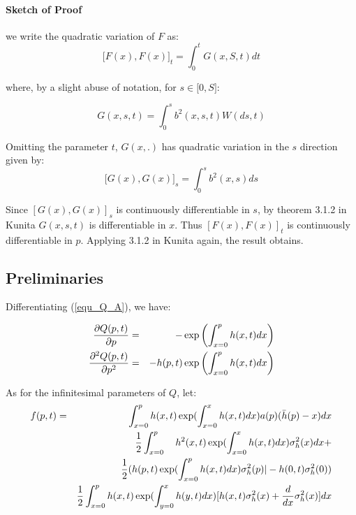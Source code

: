 \documentclass{article}
\begin{document}
\paragraph{Sketch of Proof}

we write the quadratic variation of $F$ as:%
\begin{equation*}
\lbrack F(x),F(x)]_{t}=\int_{0}^{t}G(x,S,t)dt
\end{equation*}

where, by a slight abuse of notation, for $s\in \lbrack 0,S]$:

\begin{equation*}
G(x,s,t)=\int_{0}^{s}b^{2}(x,s,t)W(ds,t)
\end{equation*}

Omitting the parameter $t$, $G(x,.)$ has quadratic variation in the $s$
direction given by:%
\begin{equation*}
\lbrack G(x),G(x)]_{s}=\int_{0}^{s}b^{2}(x,s)ds
\end{equation*}

Since $[G(x),G(x)]_{s}$ is continuously differentiable in $s$, by theorem
3.1.2 in Kunita $G(x,s,t)$ is differentiable in $x$. Thus $[F(x),F(x)]_{t}$
is continuously differentiable in $p$. Applying 3.1.2 in Kunita again, the
result obtains.

\subsection{Preliminaries}

Differentiating (\ref{equ_Q_A}), we have:

\begin{eqnarray}
\frac{\partial Q(p,t)}{\partial p} &=&-\exp \left( {\int_{x=0}^{p}h(x,t)dx}%
\right)   \label{dQdp_3} \\
\frac{\partial ^{2}Q(p,t)}{\partial p^{2}} &=&-{h(p,t)}\exp \left( {%
\int_{x=0}^{p}h(x,t)dx}\right)   \label{dQdp_2_3}
\end{eqnarray}

As for the infinitesimal parameters of $Q$, let:%
\begin{eqnarray}
f(p,t) &=&\int_{x=0}^{p}{h(x,t)}\exp ({\int_{x=0}^{x}h(x,t)dx)}a(p)(\bar{h}%
(p)-x)dx  \label{f_of_p} \\
&&\frac{1}{2}\int_{x=0}^{p}\text{ }{h}^{2}{(x,t)}\exp ({%
\int_{x=0}^{x}h(x,t)dx)}\sigma _{h}^{2}(x)dx+  \notag \\
&&\frac{1}{2}({h(p,t)}\exp ({\int_{x=0}^{p}h(x,t)dx)}\sigma _{h}^{2}(p)|-{%
h(0,t)}\sigma _{h}^{2}(0))  \notag \\
&&\frac{1}{2}\int_{x=0}^{p}{h(x,t)}\exp ({\int_{y=0}^{x}h(y,t)dx)[h(x,t)}%
\sigma _{h}^{2}(x)+\frac{d}{dx}\sigma _{h}^{2}(x)]dx  \notag
\end{eqnarray}
\end{document}
